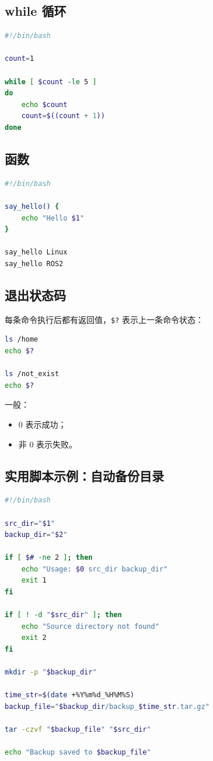 \documentclass[UTF8,a4paper,12pt]{ctexart}
\begin{document}
\subsection{while 循环}

\begin{lstlisting}[language=bash]
#!/bin/bash

count=1

while [ $count -le 5 ]
do
    echo $count
    count=$((count + 1))
done
\end{lstlisting}

\subsection{函数}

\begin{lstlisting}[language=bash]
#!/bin/bash

say_hello() {
    echo "Hello $1"
}

say_hello Linux
say_hello ROS2
\end{lstlisting}

\subsection{退出状态码}

每条命令执行后都有返回值，\texttt{\$?} 表示上一条命令状态：

\begin{lstlisting}[language=bash]
ls /home
echo $?

ls /not_exist
echo $?
\end{lstlisting}

一般：
\begin{itemize}
    \item 0 表示成功；
    \item 非 0 表示失败。
\end{itemize}

\subsection{实用脚本示例：自动备份目录}

\begin{lstlisting}[language=bash]
#!/bin/bash

src_dir="$1"
backup_dir="$2"

if [ $# -ne 2 ]; then
    echo "Usage: $0 src_dir backup_dir"
    exit 1
fi

if [ ! -d "$src_dir" ]; then
    echo "Source directory not found"
    exit 2
fi

mkdir -p "$backup_dir"

time_str=$(date +%Y%m%d_%H%M%S)
backup_file="$backup_dir/backup_$time_str.tar.gz"

tar -czvf "$backup_file" "$src_dir"

echo "Backup saved to $backup_file"
\end{lstlisting}
\end{document}
